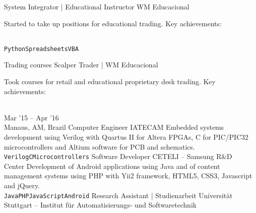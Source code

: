 \documentclass[10pt]{developercv} %
\begin{document}
\begin{entrylist}
  {System Integrator | Educational Instructor}
  {WM Educacional}
  {
    Started to take up positions for educational trading. Key achievements:\\
    \begin{contributionlist}
    \end{contributionlist}\\
    \texttt{Python}\slashsep\texttt{Spreadsheets}\slashsep\texttt{VBA}}
  {Trading courses}
  {Scalper Trader | WM Educacional}
  {
    Took courses for retail and educational proprietary desk trading. Key achievements:\\
    \begin{contributionlist}
    \end{contributionlist}}\\
  \entry
  {Mar '15 -- Apr '16\\\footnotesize{Manaus, AM, Brazil}}
  {Computer Engineer}
  {IATECAM}
  {
    Embedded systems development using Verilog with Quartus II for Altera FPGAs, C for PIC/PIC32 microcontrollers and Altium software for PCB and schematics.\\
    \texttt{Verilog}\slashsep\texttt{C}\slashsep\texttt{Microcontrollers}}
  {Software Developer}
  {CETELI -- Samsung R\&D Center}
  {
    Development of Android applications using Java and of content management systems using PHP with Yii2 framework, HTML5, CSS3, Javascript and jQuery.\\
    \texttt{Java}\slashsep\texttt{PHP}\slashsep\texttt{JavaScript}\slashsep\texttt{Android}}
  {Research Assistant | Studienarbeit}
  {Universität Stuttgart – Institut für Automatisierungs- und Softwaretechnik}

\end{entrylist}
\end{document}
